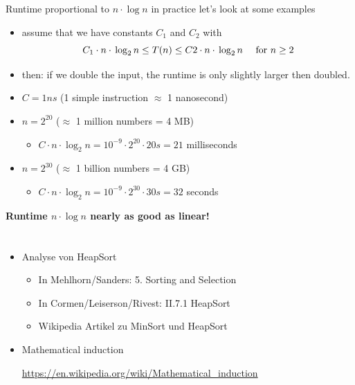 \documentclass{beamer}
\def\LectureLanguage{eng}
\newcommand\eatdot[1]{}
\begin{document}
\begin{frame}{Runtime proportional to $n\cdot \log n$ in practice}
let's look at some examples  \begin{itemize}
  \item assume that we have constants $C_1$ and $C_2$ with
    \begin{displaymath}
	C_1 \cdot{} n \cdot{} \log_2 n \leq T(n) \leq C2 \cdot{} n \cdot{} \log_2 n\quad\text{  for $ n \geq 2$}      
    \end{displaymath}
  \item then: if we double the input, the runtime is only slightly
    larger then doubled.
  \item $C = 1 ns$   (1 simple instruction $\approx$ 1 nanosecond)
  \item $n = 2^{20}$   ($\approx$ 1 million numbers = 4 MB)  
    \begin{itemize}
     \item $C \cdot{} n \cdot{} \log_2 n = 10^{-9} \cdot{} 2^{20}
      \cdot{} 20 s = 21$ milliseconds
    \end{itemize}
  \item $n = 2^{30}$   ($\approx$ 1 billion numbers = 4 GB)
    \begin{itemize}
     \item $C \cdot{} n \cdot{} \log_2 n = 10^{-9} \cdot{} 2^{30}
      \cdot{} 30 s = 32$ seconds
    \end{itemize}
  \end{itemize}
\color{red}\bf{}Runtime $n\cdot \log n$ nearly as good as linear!
\end{frame}
\appendix
\section*{\appendixname}
\subsection*{\LectureFurtherLiterature}
%
\begin{frame}{\LectureFurtherLiterature}
  \small
  \begin{itemize}
    \item Analyse von HeapSort
      \begin{itemize}
      \item In Mehlhorn/Sanders: 5. Sorting and Selection
      \item In Cormen/Leiserson/Rivest: II.7.1 HeapSort
      \item Wikipedia Artikel zu MinSort und HeapSort
      \end{itemize}
    \item      Mathematical induction
      \begin{center}
        \url{https://en.wikipedia.org/wiki/Mathematical_induction}\eatdot.
      \end{center}
  \end{itemize}
\end{frame}
\end{document}
